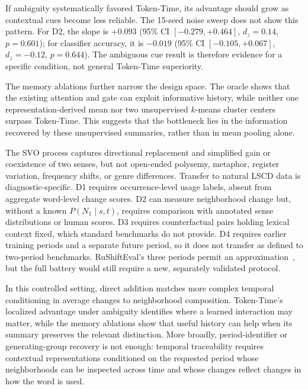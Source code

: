 \documentclass[runningheads]{llncs}
\begin{document}
If ambiguity systematically favored Token-Time, its advantage should grow as
contextual cues become less reliable. The 15-seed noise sweep does not show
this pattern. For D2, the slope is \(+0.093\) (95\% CI
\([-0.279,+0.464]\), \(d_z=0.14\), \(p=0.601\)); for classifier accuracy, it
is \(-0.019\) (95\% CI \([-0.105,+0.067]\), \(d_z=-0.12\), \(p=0.644\)).
The ambiguous cue result is therefore evidence for a specific condition,
not general Token-Time superiority.

The memory ablations further narrow the design space. The oracle shows that the
existing attention and gate can exploit informative history, while neither one
representation-derived mean nor two unsupervised \(k\)-means cluster centers surpass
Token-Time. This suggests that the bottleneck lies in the information recovered
by these unsupervised summaries, rather than in mean pooling alone.

The SVO process captures directional replacement and simplified gain or
coexistence of two senses, but not open-ended polysemy, metaphor, register
variation, frequency shifts, or genre differences. Transfer to natural LSCD
data is diagnostic-specific. D1 requires occurrence-level usage labels, absent
from aggregate word-level change scores. D2 can measure neighborhood change
but, without a known \(P(N_1\mid s,t)\), requires comparison with annotated
sense distributions or human scores. D3 requires counterfactual pairs holding
lexical context fixed, which standard benchmarks do not provide. D4 requires
earlier training periods and a separate future period, so it does not transfer
as defined to two-period benchmarks. RuShiftEval's three periods permit an
approximation~\cite{kutuzov2021rushifteval}, but the full battery would still
require a new, separately validated protocol.

In this controlled setting, direct addition matches more complex temporal
conditioning in average changes to neighborhood composition. Token-Time's localized advantage
under ambiguity identifies where a learned interaction may matter, while the
memory ablations show that useful history can help when its summary preserves
the relevant distinction. More broadly, period-identifier or generating-group recovery is not
enough: temporal traceability requires contextual representations conditioned
on the requested period whose neighborhoods can be inspected across time and
whose changes reflect changes in how the word is used.



\end{document}
